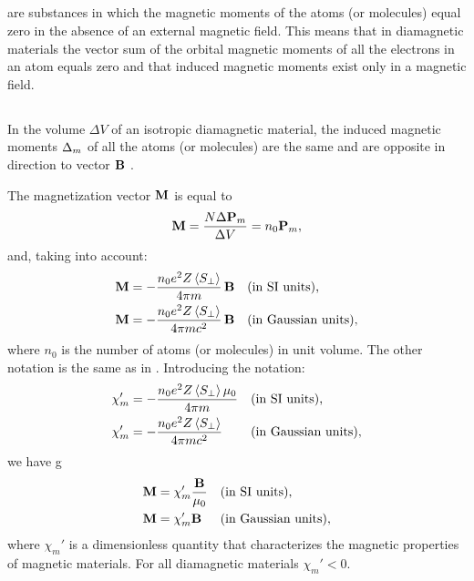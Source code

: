\subsection{}\label{26.3.2}  are substances in which the magnetic moments of the atoms (or molecules) equal zero in the absence of an external magnetic field. This means that in diamagnetic materials the vector sum of the orbital magnetic moments of all the electrons in an atom equals zero  and that induced magnetic moments  exist only in a magnetic field.

\subsection{}\label{26.3.3} In the volume $\Delta V$ of an isotropic diamagnetic material, the induced magnetic moments $\Delta \vb{}_{m}$ of all the atoms (or molecules) are the same and are opposite in direction to vector $\vb{B}$ .

The magnetization vector $\vb{M}$ is equal to 
\begin{equation*}%
\vb{M} = \frac{N \Delta \vb{P}_{m}}{\Delta V}= n_{0} \vb{P}_{m},
\end{equation*}
and, taking  into account:
\begin{align*}%
\vb{M} & =  -\frac{n_{0} e^{2} Z \expval{S_{\perp}}}{4 \pi m} \, \vb{B}&& \text{(in SI units),} \\
\vb{M} & =  -\frac{n_{0} e^{2} Z \expval{S_{\perp}}}{4 \pi mc^{2}} \,  \vb{B} && \text{(in Gaussian units)},
\end{align*}
where $n_{0}$ is the number of atoms (or molecules) in unit volume. The other notation is the same as in . Introducing the notation:
\begin{align*}%
\chi_{m}' & =  -\frac{n_{0} e^{2} Z \expval{S_{\perp}}\mu_{0}}{4 \pi m} && \text{(in SI units),} \\
\chi_{m}' & =  -\frac{n_{0} e^{2} Z \expval{S_{\perp}}}{4 \pi mc^{2}} && \text{(in Gaussian units)},
\end{align*}
we have g
\begin{align*}%
\vb{M} & =  \chi_{m}' \frac{\vb{B}}{\mu_{0}} && \text{(in SI units),} \\
\vb{M} & =  \chi_{m}' {\vb{B}}  && \text{(in Gaussian units)},
\end{align*}
where $\chi_{m}'$ is a dimensionless quantity that characterizes the magnetic properties of magnetic materials. For all diamagnetic
materials $\chi_{m}' < 0$.


